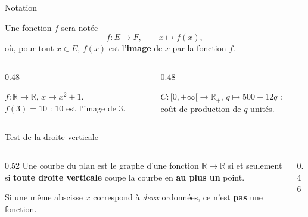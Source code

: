 \documentclass[aspectratio=169,11pt]{beamer}
\newcommand{\R}{\mathbb{R}}
\newcommand{\key}[1]{\textbf{\color{DarkBlue}#1}}
\newcommand{\important}[1]{\textbf{\color{DarkRed}#1}}
\newcommand{\fonc}[3]{#1\colon #2\to #3}
\begin{document}
\begin{frame}{Notation}
	\begin{definitionbox}[Notation]
		Une fonction $f$ sera notée
		\[
			f \colon E \longrightarrow F, \qquad
			x \longmapsto f(x),
		\]
		où, pour tout $x\in E$, $f(x)$ est l'\key{image} de $x$ par la fonction $f$.
	\end{definitionbox}
	\vspace{0.2cm}
	\begin{columns}[T]
		\begin{column}{0.48\textwidth}
			\begin{exemplebox}
				$\fonc{f}{\R}{\R}$, $x\longmapsto x^2+1$.\\
				$f(3)=10$ : $10$ est l'image de $3$.
			\end{exemplebox}
		\end{column}
		\begin{column}{0.48\textwidth}
			\begin{exemplebox}[En gestion]
				$\fonc{C}{[0,+\infty[}{\R_+}$, $q\longmapsto 500+12q$ :\\
				coût de production de $q$ unités.
			\end{exemplebox}
		\end{column}
	\end{columns}
\end{frame}

\begin{frame}{Test de la droite verticale}
	\begin{columns}[c]
		\begin{column}{0.52\textwidth}
			Une courbe du plan est le graphe d'une fonction $\R\to\R$
			si et seulement si \important{toute droite verticale} coupe la courbe
			en \important{au plus un} point.
			\vspace{0.3cm}
			\begin{attentionbox}
				Si une même abscisse $x$ correspond à \emph{deux} ordonnées,
				ce n'est \important{pas} une fonction.
			\end{attentionbox}
		\end{column}
		\begin{column}{0.46\textwidth}
			\centering
		\end{column}
	\end{columns}
\end{frame}
\end{document}
